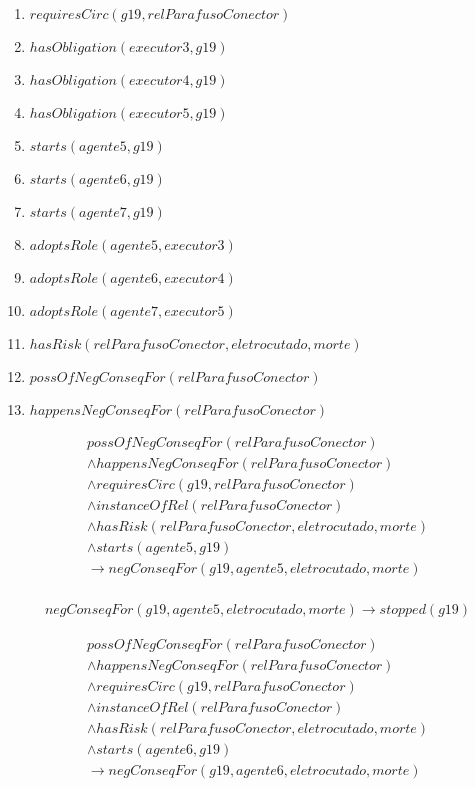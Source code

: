 \begin{enumerate}	
	\item $requiresCirc(g19,relParafusoConector)$		
	\item $hasObligation(executor3,g19)$
	\item $hasObligation(executor4,g19)$
	\item $hasObligation(executor5,g19)$		
	\item $starts(agente5,g19)$
	\item $starts(agente6,g19)$
	\item $starts(agente7,g19)$									
	\item $adoptsRole(agente5,executor3)$
	\item $adoptsRole(agente6,executor4)$
	\item $adoptsRole(agente7,executor5)$
	\item $hasRisk(relParafusoConector,eletrocutado,morte)$
	\item $possOfNegConseqFor(relParafusoConector)$
	\item $happensNegConseqFor(relParafusoConector)$	
\end{enumerate}


\begin{eqnarray}\nonumber
   possOfNegConseqFor(relParafusoConector) \nonumber \\
    \wedge happensNegConseqFor(relParafusoConector) \nonumber \\ 
    \wedge requiresCirc(g19,relParafusoConector) \nonumber \\  
    \wedge instanceOfRel(relParafusoConector) \nonumber \\ 
    \wedge hasRisk(relParafusoConector,eletrocutado,morte) \nonumber \\  
    \wedge starts(agente5,g19) \nonumber \\ 
    \to negConseqFor(g19,agente5,eletrocutado,morte) \\ \nonumber    
\end{eqnarray}

\begin{eqnarray}
	negConseqFor(g19,agente5,eletrocutado,morte) \to stopped(g19)
\end{eqnarray}

\begin{eqnarray}\nonumber
   possOfNegConseqFor(relParafusoConector) \nonumber \\
    \wedge happensNegConseqFor(relParafusoConector) \nonumber \\ 
    \wedge requiresCirc(g19,relParafusoConector) \nonumber \\  
    \wedge instanceOfRel(relParafusoConector) \nonumber \\ 
    \wedge hasRisk(relParafusoConector,eletrocutado,morte) \nonumber \\  
    \wedge starts(agente6,g19) \nonumber \\ 
    \to negConseqFor(g19,agente6,eletrocutado,morte) \\ \nonumber    
\end{eqnarray}

